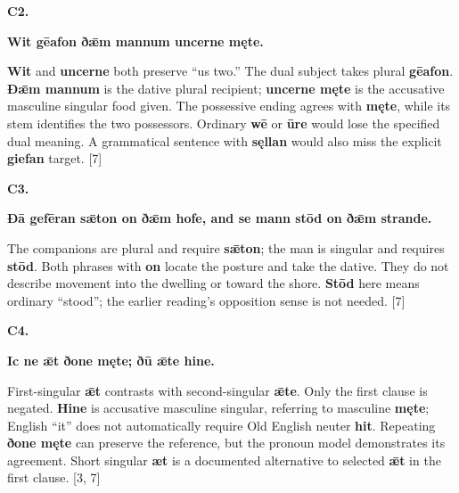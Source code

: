 \par\begin{minipage}{\linewidth}\raggedright
\textbf{C2.}

\textbf{Wit gēafon ðǣm mannum uncerne męte.}

\textbf{Wit} and \textbf{uncerne} both preserve “us two.” The dual subject takes plural \textbf{gēafon}. \textbf{Ðǣm mannum} is the dative plural recipient; \textbf{uncerne męte} is the accusative masculine singular food given. The possessive ending agrees with \textbf{męte}, while its stem identifies the two possessors. Ordinary \textbf{wē} or \textbf{ūre} would lose the specified dual meaning. A grammatical sentence with \textbf{sęllan} would also miss the explicit \textbf{giefan} target. [7]

\end{minipage}\par\addvspace{4pt}

\par\begin{minipage}{\linewidth}\raggedright
\textbf{C3.}

\textbf{Ðā gefēran sǣton on ðǣm hofe, and se mann stōd on ðǣm strande.}

The companions are plural and require \textbf{sǣton}; the man is singular and requires \textbf{stōd}. Both phrases with \textbf{on} locate the posture and take the dative. They do not describe movement into the dwelling or toward the shore. \textbf{Stōd} here means ordinary “stood”; the earlier reading's opposition sense is not needed. [7]

\end{minipage}\par\addvspace{4pt}

\par\begin{minipage}{\linewidth}\raggedright
\textbf{C4.}

\textbf{Ic ne ǣt ðone męte; ðū ǣte hine.}

First-singular \textbf{ǣt} contrasts with second-singular \textbf{ǣte}. Only the first clause is negated. \textbf{Hine} is accusative masculine singular, referring to masculine \textbf{męte}; English “it” does not automatically require Old English neuter \textbf{hit}. Repeating \textbf{ðone męte} can preserve the reference, but the pronoun model demonstrates its agreement. Short singular \textbf{æt} is a documented alternative to selected \textbf{ǣt} in the first clause. [3, 7]

\end{minipage}\par\addvspace{4pt}

